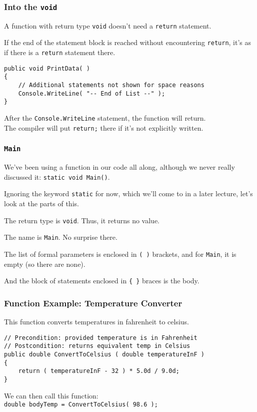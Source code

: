 \begin{frame}[fragile]
\frametitle{Into the \texttt{void}}

A function with return type \texttt{void} doesn't need a \texttt{return} statement.

If the end of the statement block is reached without encountering \texttt{return}, it's as if there is a \texttt{return} statement there.

\begin{verbatim}
public void PrintData( )
{
    // Additional statements not shown for space reasons
    Console.WriteLine( "-- End of List --" );
}
\end{verbatim}

After the \texttt{Console.WriteLine} statement, the function will return.\\
\quad The compiler will put \texttt{return;} there if it's not explicitly written.

\end{frame}


\begin{frame}
\frametitle{\texttt{Main}}

We've been using a function in our code all along, although we never really discussed it: \texttt{static void Main()}.

Ignoring the keyword \texttt{static} for now, which we'll come to in a later lecture, let's look at the parts of this.

The return type is \texttt{void}. Thus, it returns no value.

The name is \texttt{Main}. No surprise there.

The list of formal parameters is enclosed in \texttt{( )} brackets, and for \texttt{Main}, it is empty (so there are none).

And the block of statements enclosed in \texttt{\{ \}} braces is the body.

\end{frame}

\begin{frame}[fragile]
\frametitle{Function Example: Temperature Converter}

This function converts temperatures in fahrenheit to celsius.

\begin{verbatim}
// Precondition: provided temperature is in Fahrenheit
// Postcondition: returns equivalent temp in Celsius
public double ConvertToCelsius ( double temperatureInF )
{
    return ( temperatureInF - 32 ) * 5.0d / 9.0d;
}
\end{verbatim}

We can then call this function:\\
\quad \texttt{double bodyTemp = ConvertToCelsius( 98.6 );}

\end{frame}

